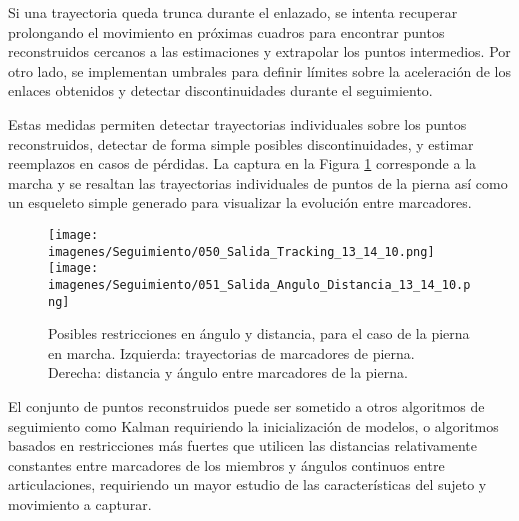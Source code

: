 Si una trayectoria queda trunca durante el enlazado, se intenta recuperar prolongando el movimiento en próximas cuadros para encontrar puntos reconstruidos cercanos a las estimaciones y extrapolar los puntos intermedios. Por otro lado, se implementan umbrales para definir límites sobre la aceleración de los enlaces obtenidos y detectar discontinuidades durante el seguimiento.

Estas medidas permiten detectar trayectorias individuales sobre los puntos reconstruidos, detectar de forma simple posibles discontinuidades, y estimar reemplazos en casos de pérdidas. La captura en la Figura \ref{restricciones_tracking} corresponde a la marcha y se resaltan las trayectorias individuales de puntos de la pierna así como un esqueleto simple generado para visualizar la evolución entre marcadores.\\
\begin{figure}[ht!]
 \begin{center}
  {\texttt{[image: imagenes/Seguimiento/050\_Salida\_Tracking\_13\_14\_10.png]} %
   }	
 {\texttt{[image: imagenes/Seguimiento/051\_Salida\_Angulo\_Distancia\_13\_14\_10.png]}\label{distancia_angulo_marcadores_piernas}}
  \end{center}
\caption{Posibles restricciones en ángulo y distancia, para el caso de la pierna en marcha. Izquierda: trayectorias de marcadores de pierna. Derecha: distancia y ángulo entre marcadores de la pierna.}
\label{restricciones_tracking}
\end{figure}
El conjunto de puntos reconstruidos puede ser sometido a otros algoritmos de seguimiento como Kalman \cite{kalman} requiriendo la inicialización de modelos, o algoritmos basados en restricciones más fuertes que utilicen las distancias relativamente constantes entre marcadores de los miembros y ángulos continuos entre articulaciones, requiriendo un mayor estudio de las características del sujeto y movimiento a capturar. %

